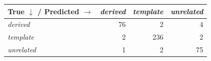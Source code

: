 \begin{tabular}{lrrr}
\toprule
True $\downarrow$ / Predicted $\rightarrow$ & \textit{derived} & \textit{template} & \textit{unrelated} \\
\midrule
\textit{derived} & 76 & 2 & 4 \\
\textit{template} & 2 & 236 & 2 \\
\textit{unrelated} & 1 & 2 & 75 \\
\bottomrule
\end{tabular}
